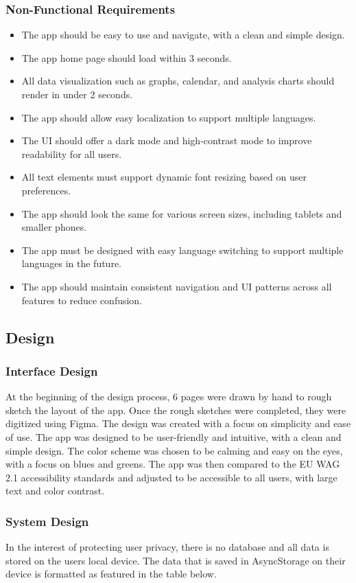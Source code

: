 \subsubsection{Non-Functional Requirements}
\begin{itemize}
  \item The app should be easy to use and navigate, with a clean and simple design.
  \item The app home page should load within 3 seconds.
  \item All data visualization such as graphs, calendar, and analysis charts should render in under 2 seconds.
  \item The app should allow easy localization to support multiple languages.
  \item The UI should offer a dark mode and high-contrast mode to improve readability for all users.
  \item All text elements must support dynamic font resizing based on user preferences.
  \item The app should look the same for various screen sizes, including tablets and smaller phones.
  \item The app must be designed with easy language switching to support multiple languages in the future.
  \item The app should maintain consistent navigation and UI patterns across all features to reduce confusion.
\end{itemize}

\subsection{Design}

\subsubsection{Interface Design}
At the beginning of the design process, 6 pages were drawn by hand to rough sketch the layout of the app. Once the rough sketches were completed, they were digitized using Figma. The design was created with a focus on simplicity and ease of use. The app was designed to be user-friendly and intuitive, with a clean and simple design. The color scheme was chosen to be calming and easy on the eyes, with a focus on blues and greens. The app was then compared to the EU WAG 2.1 accessibility standards and adjusted to be accessible to all users, with large text and color contrast. 

 \subsubsection{System Design}
 In the interest of protecting user privacy, there is no database and all data is stored on the users local device. The data that is saved in AsyncStorage on their device is formatted as featured in the table below.

